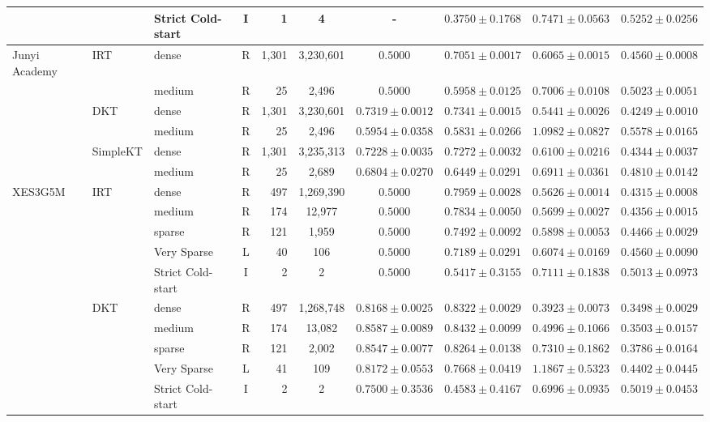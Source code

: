 \begin{table}[tbp]
{\begin{tabular}{lllcrccccc}
 &  & Strict Cold-start & I & 1 & 4 & - & $0.3750 \pm 0.1768$ & $0.7471 \pm 0.0563$ & $0.5252 \pm 0.0256$ \\
\midrule
Junyi Academy & IRT & dense & R & 1,301 & 3,230,601 & $0.5000$ & $0.7051 \pm 0.0017$ & $0.6065 \pm 0.0015$ & $0.4560 \pm 0.0008$ \\
 &  & medium & R & 25 & 2,496 & $0.5000$ & $0.5958 \pm 0.0125$ & $0.7006 \pm 0.0108$ & $0.5023 \pm 0.0051$ \\
 & DKT & dense & R & 1,301 & 3,230,601 & $0.7319 \pm 0.0012$ & $0.7341 \pm 0.0015$ & $0.5441 \pm 0.0026$ & $0.4249 \pm 0.0010$ \\
 &  & medium & R & 25 & 2,496 & $0.5954 \pm 0.0358$ & $0.5831 \pm 0.0266$ & $1.0982 \pm 0.0827$ & $0.5578 \pm 0.0165$ \\
 & SimpleKT & dense & R & 1,301 & 3,235,313 & $0.7228 \pm 0.0035$ & $0.7272 \pm 0.0032$ & $0.6100 \pm 0.0216$ & $0.4344 \pm 0.0037$ \\
 &  & medium & R & 25 & 2,689 & $0.6804 \pm 0.0270$ & $0.6449 \pm 0.0291$ & $0.6911 \pm 0.0361$ & $0.4810 \pm 0.0142$ \\
\midrule
XES3G5M & IRT & dense & R & 497 & 1,269,390 & $0.5000$ & $0.7959 \pm 0.0028$ & $0.5626 \pm 0.0014$ & $0.4315 \pm 0.0008$ \\
 &  & medium & R & 174 & 12,977 & $0.5000$ & $0.7834 \pm 0.0050$ & $0.5699 \pm 0.0027$ & $0.4356 \pm 0.0015$ \\
 &  & sparse & R & 121 & 1,959 & $0.5000$ & $0.7492 \pm 0.0092$ & $0.5898 \pm 0.0053$ & $0.4466 \pm 0.0029$ \\
 &  & Very Sparse & L & 40 & 106 & $0.5000$ & $0.7189 \pm 0.0291$ & $0.6074 \pm 0.0169$ & $0.4560 \pm 0.0090$ \\
 &  & Strict Cold-start & I & 2 & 2 & $0.5000$ & $0.5417 \pm 0.3155$ & $0.7111 \pm 0.1838$ & $0.5013 \pm 0.0973$ \\
 & DKT & dense & R & 497 & 1,268,748 & $0.8168 \pm 0.0025$ & $0.8322 \pm 0.0029$ & $0.3923 \pm 0.0073$ & $0.3498 \pm 0.0029$ \\
 &  & medium & R & 174 & 13,082 & $0.8587 \pm 0.0089$ & $0.8432 \pm 0.0099$ & $0.4996 \pm 0.1066$ & $0.3503 \pm 0.0157$ \\
 &  & sparse & R & 121 & 2,002 & $0.8547 \pm 0.0077$ & $0.8264 \pm 0.0138$ & $0.7310 \pm 0.1862$ & $0.3786 \pm 0.0164$ \\
 &  & Very Sparse & L & 41 & 109 & $0.8172 \pm 0.0553$ & $0.7668 \pm 0.0419$ & $1.1867 \pm 0.5323$ & $0.4402 \pm 0.0445$ \\
 &  & Strict Cold-start & I & 2 & 2 & $0.7500 \pm 0.3536$ & $0.4583 \pm 0.4167$ & $0.6996 \pm 0.0935$ & $0.5019 \pm 0.0453$ \\

\end{tabular}}
\end{table}
